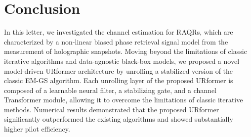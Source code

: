 \documentclass[journal]{IEEEtran}
\begin{document}
\section{Conclusion}
In this letter, we investigated the channel estimation for RAQRs, which are characterized by a non-linear biased phase retrieval signal model from the measurement of holographic snapshots. Moving beyond the limitations of classic iterative algorithms and data-agnostic black-box models, we proposed a novel model-driven URformer architecture by unrolling a stabilized version of the classic EM-GS algorithm. Each unrolling layer of the proposed URformer is composed of a learnable neural filter, a stabilizing gate, and a channel Transformer module, allowing it to overcome the limitations of classic iterative methods. Numerical results demonstrated that the proposed URformer significantly outperformed the existing algorithms and showed substantially higher pilot efficiency. 



\end{document}
